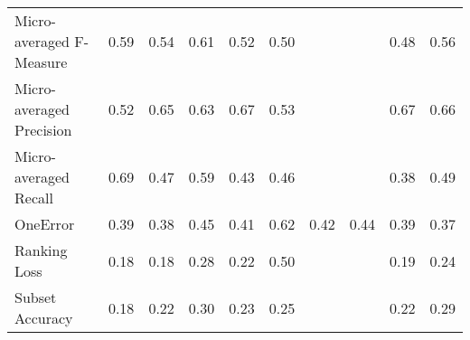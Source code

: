 \begin{tabular}{l|rrrrrrrrr}
Micro-averaged F-Measure & 0.59 & 0.54 & 0.61 & 0.52 & 0.50 &  &  & 0.48 & 0.56 \\

Micro-averaged Precision & 0.52 & 0.65 & 0.63 & 0.67 & 0.53 &  &  & 0.67 & 0.66 \\

Micro-averaged Recall & 0.69 & 0.47 & 0.59 & 0.43 & 0.46 &  &  & 0.38 & 0.49 \\

OneError & 0.39 & 0.38 & 0.45 & 0.41 & 0.62 & 0.42 & 0.44 & 0.39 & 0.37 \\

Ranking Loss & 0.18 & 0.18 & 0.28 & 0.22 & 0.50 &  &  & 0.19 & 0.24 \\

Subset Accuracy & 0.18 & 0.22 & 0.30 & 0.23 & 0.25 &  &  & 0.22 & 0.29 \\

\end{tabular}

